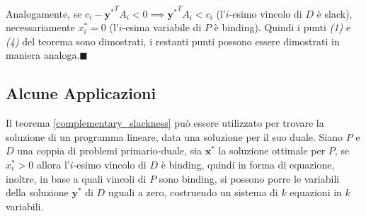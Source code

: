 \documentclass[10pt, letterpaper]{report}
\newcommand{\x}{{\mathbf{x}}}
\newcommand{\y}{{\mathbf{y}}}
\begin{document}
Analogamente, se $c_i-{\y^*}^TA_i<0\implies {\y^*}^TA_i<c_i$ (l'$i$-esimo vincolo di $D$ è slack), necessariamente $x_i^*=0$ (l'$i$-esima variabile di $P$ è binding). Quindi i punti \textit{(1)} e \textit{(4)} del teorema sono dimostrati, i restanti punti possono essere dimostrati in maniera analoga.\hfill$\blacksquare$
\subsection{Alcune Applicazioni}
Il teorema \ref{complementary_slackness} può essere utilizzato per trovare la soluzione di un programma lineare, data una soluzione per il suo duale.
Siano $P$ e $D$ una coppia di problemi primario-duale, sia $\x^*$ la soluzione ottimale per $P$, se $x_i^*>0$ allora l'$i$-esimo vincolo di $D$ è binding, quindi in forma di equazione, inoltre, in base a quali vincoli di $P$ sono binding, si possono porre le variabili della soluzione $\y^*$ di $D$ uguali a zero, costruendo un sistema di $k$ equazioni in $k$ variabili.\bigskip 
\end{document}
